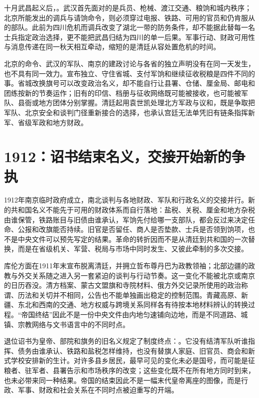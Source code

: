 十月武昌起义后，。武汉首先面对的是兵员、枪械、渡江交通、粮饷和城内秩序；北京所能发出的调兵与请饷命令，则必须穿过电报、铁路、可用的官员和仍肯服从的部队。此前为四川危机而调兵改变了湖北一带的防务条件，却不能据此替每一名士兵指定政治选择，更不能把武昌归结为四川的单一后果。军事行动、财政可用性与消息传递在同一秋天相互牵动，缩短的是清廷从容处置危机的时间。

北京的命令、武汉的军队、南京的建政讨论与各省的独立声明没有在同一天发生，也不具有同一效力。宣布独立、守住省城、支付军饷和继续征收税粮是四件不同的事。省城改换旗号可以改变政治名义，却不能自行让县署、仓储、厘金局、邮电和团练按新的节奏运作；旧有的印信、档册与征收网络既可能被接收，也可能被军队、县衙或地方团体分别掌握。清廷起用袁世凯处理北方军政与议和，既是争取把军队、北京安全和谈判门径重新接合的选择，也承认宫廷无法单凭旧有链条指挥新军、省级军政和地方财政。

\section{1912：诏书结束名义，交接开始新的争执}

1912年南京临时政府成立，南北谈判与各地财政、军队和行政名义的交接并行。新的共和国名义不能先于可用的财政体系而自行落地：盐税、关税、厘金和地方杂税由谁保管，铁路账目与旧债由谁承认，军饷先付给哪一支部队，都会反过来决定任命、公报和改旗能否持续。旧官是否留任、商人是否垫款、士兵是否领到饷项，也不是中央文件可以预先写定的结果。革命的转折因而不是从清廷到共和国的一次替换，而是在省级机关、军营、税局与市场中同时发生、又彼此牵制的多次交接。

库伦方面在1911年末宣布脱离清廷，并拥立哲布尊丹巴为政教领袖；北部边疆的政教与外交关系随之进入另一套紧迫的谈判与行动节奏。这一变化不能被北京或南京的日历吞没。清方档案、蒙古文盟旗和寺院材料、俄方外交记录所使用的政治称谓、历法和关切并不相同，公告也不能单独画出稳定的控制范围。青藏高原、新疆、东北和西南的交通、地方权威与跨境关系同样各有待按本地材料辨认的转换过程。“帝国终结”因此不是一份中央文件由内地匀速铺向边地，而是不同道路、城镇、宗教网络与文书语言中的不同时点。

退位诏书为皇帝、部院和旗务的旧名义规定了制度终点：。它没有结清军队听谁指挥、债务由谁承认、铁路和盐税怎样维持，也没有替旗人家庭、旧官员、商会和新式学校安排新的生计。对许多县乡居民，最早可见的变化未必是国号，而可能是征粮者、驻军者、县署告示和市场秩序的改变；这些变化既不在所有地方同时到来，也未必带来同一种结果。帝国的结束因此不是一幅末代皇帝离座的图像，而是行政、军事、财政和社会关系在不同时点被迫重写的开端。

